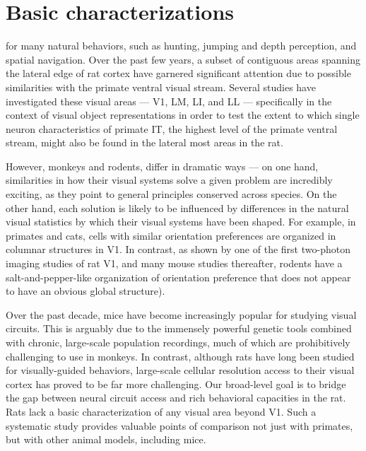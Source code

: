 
\chapter{Basic characterizations}



 for many natural behaviors, such as hunting, jumping and depth perception, and spatial navigation. Over the past few years, a subset of contiguous areas spanning the lateral edge of rat cortex have garnered significant attention due to possible similarities with the primate ventral visual stream. Several studies \cite{Vermaercke2014, Tafazoli2017, Vinken2016NeuralCortex} have investigated these visual areas --- V1, LM, LI, and LL --- specifically in the context of visual object representations in order to test the extent to which single neuron characteristics of primate IT, the highest level of the primate ventral stream, might also be found in the lateral most areas in the rat. 

However, monkeys and rodents, differ in dramatic ways --- on one hand, similarities in how their visual systems solve a given problem are incredibly exciting, as they point to general principles conserved across species. On the other hand, each solution is likely to be influenced by differences in the natural visual statistics by which their visual systems have been shaped. For example, in primates and cats, cells with similar orientation preferences are organized in columnar structures in V1. In contrast, as shown by one of the first two-photon imaging studies of rat V1, and many mouse studies thereafter, rodents have a salt-and-pepper-like organization of orientation preference that does not appear to have an obvious global structure\cite{Ohki2005}). 

Over the past decade, mice have become increasingly popular for studying visual circuits. This is arguably due to the immensely powerful genetic tools combined with chronic, large-scale population recordings, much of which are prohibitively challenging to use in monkeys. In contrast, although rats have long been studied for visually-guided behaviors, large-scale cellular resolution access to their visual cortex has proved to be far more challenging. Our broad-level goal is to bridge the gap between neural circuit access and rich behavioral capacities in the rat. Rats lack a basic characterization of any visual area beyond V1. Such a systematic study provides valuable points of comparison not just with primates, but with other animal models, including mice. 

